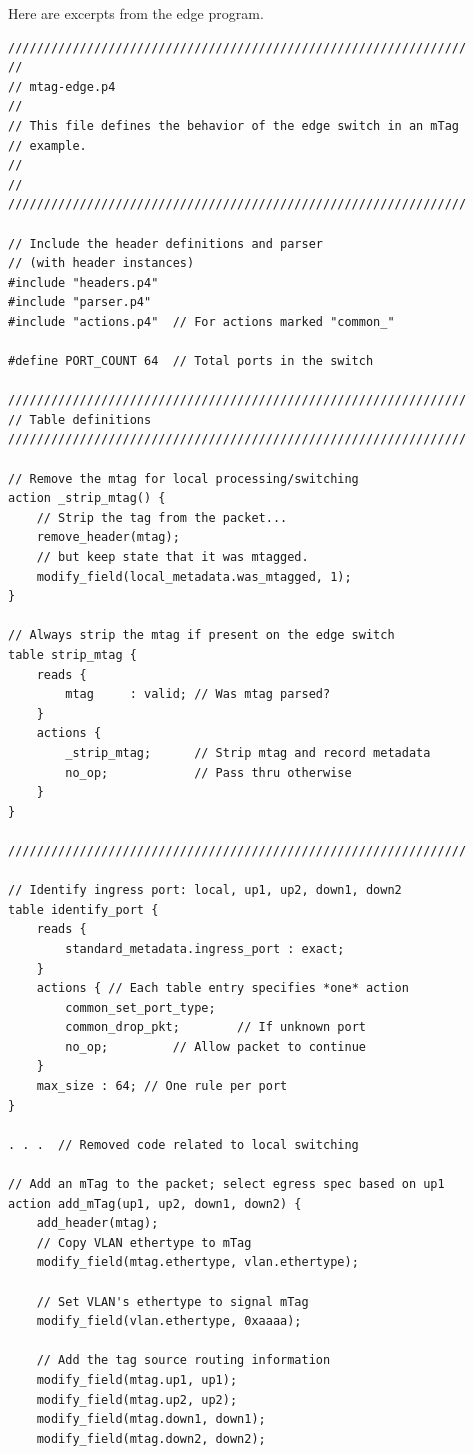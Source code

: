 \documentclass[12pt]{article}
\begin{document}
\begin{itemize}
Here are excerpts from the edge program.

\begin{lstlisting}[keywords={},frame=single,escapechar=\@]
////////////////////////////////////////////////////////////////
//
// mtag-edge.p4
//
// This file defines the behavior of the edge switch in an mTag
// example.
//
//
////////////////////////////////////////////////////////////////

// Include the header definitions and parser
// (with header instances)
#include "headers.p4"
#include "parser.p4"
#include "actions.p4"  // For actions marked "common_"

#define PORT_COUNT 64  // Total ports in the switch

////////////////////////////////////////////////////////////////
// Table definitions
////////////////////////////////////////////////////////////////

// Remove the mtag for local processing/switching
action _strip_mtag() {
    // Strip the tag from the packet...
    remove_header(mtag);
    // but keep state that it was mtagged.
    modify_field(local_metadata.was_mtagged, 1);
}

// Always strip the mtag if present on the edge switch
table strip_mtag {
    reads {
        mtag     : valid; // Was mtag parsed?
    }
    actions {
        _strip_mtag;      // Strip mtag and record metadata
        no_op;            // Pass thru otherwise
    }
}

////////////////////////////////////////////////////////////////

// Identify ingress port: local, up1, up2, down1, down2
table identify_port {
    reads {
        standard_metadata.ingress_port : exact;
    }
    actions { // Each table entry specifies *one* action
        common_set_port_type;
        common_drop_pkt;        // If unknown port
        no_op;         // Allow packet to continue
    }
    max_size : 64; // One rule per port
}

. . .  // Removed code related to local switching

// Add an mTag to the packet; select egress spec based on up1
action add_mTag(up1, up2, down1, down2) {
    add_header(mtag);
    // Copy VLAN ethertype to mTag
    modify_field(mtag.ethertype, vlan.ethertype);

    // Set VLAN's ethertype to signal mTag
    modify_field(vlan.ethertype, 0xaaaa);

    // Add the tag source routing information
    modify_field(mtag.up1, up1);
    modify_field(mtag.up2, up2);
    modify_field(mtag.down1, down1);
    modify_field(mtag.down2, down2);


\end{lstlisting}
\end{itemize}
\end{document}
